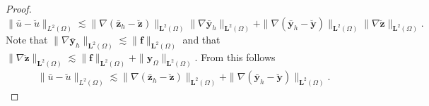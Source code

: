 \documentclass[final]{siamart0216}
\begin{document}
\begin{proof}
$
	\|\bar{u} - \breve{u}\|_{L^2(\Omega)}\lesssim \|\nabla(\bar{\mathbf{z}}_{h} - \breve{\mathbf{z}})\|_{\mathbf{L}^2(\Omega)}\| \nabla\bar{\mathbf{y}}_{h}\|_{\mathbf{L}^2(\Omega)} +  \|\nabla(\bar{\mathbf{y}}_{h} - \breve{\mathbf{y}})\|_{\mathbf{L}^2(\Omega)}\| \nabla\breve{\mathbf{z}}\|_{\mathbf{L}^2(\Omega)}.
$
Note that $\| \nabla\bar{\mathbf{y}}_{h}\|_{\mathbf{L}^2(\Omega)}\lesssim \|\mathbf{f}\|_{\mathbf{L}^2(\Omega)}$ and that
$
\|\nabla \breve{\mathbf{z}}\|_{\mathbf{L}^2(\Omega)}
\lesssim \|\mathbf{f}\|_{\mathbf{L}^2(\Omega)}+\|\mathbf{y}_{\Omega}\|_{\mathbf{L}^2(\Omega)}$.
From this follows
\begin{align}\label{eq:bound_03}
	\|\bar{u}-\breve{u}\|_{L^2(\Omega)}\lesssim \|\nabla(\bar{\mathbf{z}}_{h}-\breve{\mathbf{z}})\|_{\mathbf{L}^2(\Omega)}+ \|\nabla(\bar{\mathbf{y}}_{h}-\breve{\mathbf{y}})\|_{\mathbf{L}^2(\Omega)}.
\end{align}


\end{proof}
\end{document}
